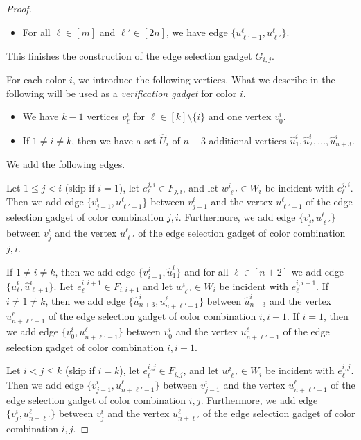 \documentclass[11pt,a4paper]{article}
\theoremstyle{remark}
\theoremstyle{definition}
\begin{document}
\begin{proof}
\begin{itemize}
        \item For all $\ell\in [m]$ and $\ell'\in [2n]$, we have edge $\{u^\ell_{\ell'-1},u^\ell_{\ell'}\}$.
    \end{itemize}
    This finishes the construction of the edge selection gadget $G_{i,j}$.

    For each color $i$, we introduce the following vertices. What we describe in the following will be used as a \emph{verification gadget} for color $i$.
    \begin{itemize}
        \item We have $k-1$ vertices $v^i_\ell$ for $\ell\in[k]\setminus\{i\}$ and one vertex $v^i_0$.
        \item If $1\neq i\neq k$, then we have a set $\hat{U}_i$ of $n+3$ additional vertices $\hat{u}^i_1,\hat{u}^i_2,\ldots,\hat{u}^i_{n+3}$.
    \end{itemize}
    We add the following edges. 
    
    Let $1\le j<i$ (skip if $i=1$), let $e_\ell^{j,i}\in F_{j,i}$, and let $w^i_{\ell'}\in W_i$ be incident with $e_\ell^{j,i}$. Then we add edge $\{v_{j-1}^i,u^\ell_{\ell'-1}\}$ between $v^i_{j-1}$ and the vertex $u^\ell_{\ell'-1}$ of the edge selection gadget of color combination $j,i$.
    Furthermore, we add edge $\{v_{j}^i,u^\ell_{\ell'}\}$ between $v^i_j$ and the vertex $u^\ell_{\ell'}$ of the edge selection gadget of color combination $j,i$.

    If $1\neq i\neq k$, then we add edge $\{v^i_{i-1},\hat{u}^i_1\}$ and for all $\ell\in[n+2]$ we add edge $\{\hat{u}^i_\ell,\hat{u}^i_{\ell+1}\}$. 
    Let $e_\ell^{i,i+1}\in F_{i,i+1}$ and let $w^i_{\ell'}\in W_i$ be incident with $e_\ell^{i,i+1}$. If $i\neq 1\neq k$, then we add edge $\{\hat{u}^i_{n+3},u^\ell_{n+\ell'-1}\}$ between $\hat{u}^i_{n+3}$ and the vertex $u^\ell_{n+\ell'-1}$ of the edge selection gadget of color combination $i,i+1$. If $i=1$, then we add edge $\{v^i_0,u^\ell_{n+\ell'-1}\}$ between $v^i_0$ and the vertex $u^\ell_{n+\ell'-1}$ of the edge selection gadget of color combination $i,i+1$.

    Let $i<j\le k$ (skip if $i=k$), let $e_\ell^{i,j}\in F_{i,j}$, and let $w^i_{\ell'}\in W_i$ be incident with $e_\ell^{i,j}$. Then we add edge $\{v_{j-1}^i,u^\ell_{n+\ell'-1}\}$ between $v^i_{j-1}$ and the vertex $u^\ell_{n+\ell'-1}$ of the edge selection gadget of color combination $i,j$.
    Furthermore, we add edge $\{v_{j}^i,u^\ell_{n+\ell'}\}$ between $v^i_j$ and the vertex $u^\ell_{n+\ell'}$ of the edge selection gadget of color combination $i,j$.



\end{proof}
\end{document}
